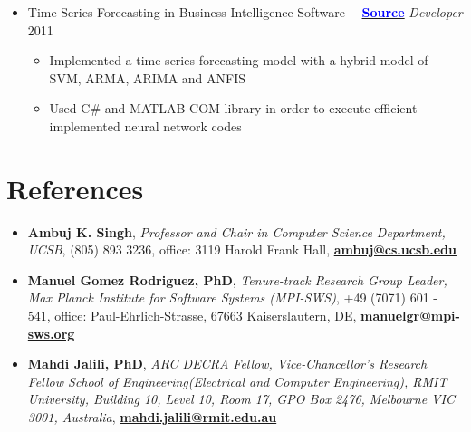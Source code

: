 \documentclass[letter]{res}
\begin{document}
\begin{resume}
\begin{itemize}[leftmargin=-.1in]
			\item Time Series Forecasting in Business Intelligence Software ~~{\href{https://github.com/omid55/time_series_forecasting_business_intelligence}{\textbf{\textcolor{blue}{Source}}}}
			\newline
			{\sl Developer} \hfill 2011\\
			\vspace{-4mm}
			\iflong
			\begin{itemize}
				\item Implemented a time series forecasting model with a hybrid model of SVM, ARMA, ARIMA and ANFIS
				\item Used C\# and MATLAB COM library in order to execute efficient implemented neural network codes
			\end{itemize}
			\fi
			
		\end{itemize}
		
		
		\section{References}
		\begin{itemize}[leftmargin=-.1in]
			\item \textbf{Ambuj K. Singh}, \textit{Professor and Chair in Computer Science Department, UCSB}, (805) 893 3236, office: 3119 Harold Frank Hall, \href{mailto:manuelgr@mpi-sws.org}{\textbf{ambuj@cs.ucsb.edu}}
			
			\item \textbf{Manuel Gomez Rodriguez, PhD}, \textit{Tenure-track Research Group Leader, Max Planck Institute for Software Systems (MPI-SWS)}, +49 (7071) 601 - 541, office: Paul-Ehrlich-Strasse, 67663 Kaiserslautern, DE, \href{mailto:manuelgr@mpi-sws.org}{\textbf{manuelgr@mpi-sws.org}}
			
			\item \textbf{Mahdi Jalili, PhD}, \textit{ARC DECRA Fellow, Vice-Chancellor's Research Fellow School of Engineering(Electrical and Computer Engineering), RMIT University, Building 10, Level 10, Room 17, GPO Box 2476, Melbourne VIC 3001, Australia}, \href{mailto:mahdi.jalili@rmit.edu.au}{\textbf{mahdi.jalili@rmit.edu.au}}\\
			
		\end{itemize}
		\centerline{}
		
	\end{resume}
\end{document}
